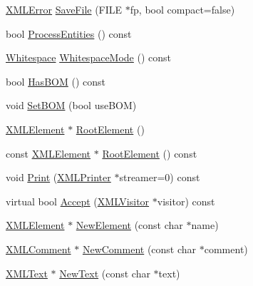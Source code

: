 \begin{DoxyCompactItemize}
\item 
\hyperlink{namespacetinyxml2_a1fbf88509c3ac88c09117b1947414e08}{X\+M\+L\+Error} \hyperlink{classtinyxml2_1_1_x_m_l_document_a8b95779479a0035acc67b3a61dfe1b74}{Save\+File} (F\+I\+L\+E $\ast$fp, bool compact=false)
\item 
bool \hyperlink{classtinyxml2_1_1_x_m_l_document_adfcff7d0599cd520e9fcbb8891e1b678}{Process\+Entities} () const 
\item 
\hyperlink{namespacetinyxml2_a7f91d00f77360f850fd5da0861e27dd5}{Whitespace} \hyperlink{classtinyxml2_1_1_x_m_l_document_a94b3ea2f77c9ac831723984df5a02d01}{Whitespace\+Mode} () const 
\item 
bool \hyperlink{classtinyxml2_1_1_x_m_l_document_a530649e9de7e5aa8df9c37f66197fcb6}{Has\+B\+O\+M} () const 
\item 
void \hyperlink{classtinyxml2_1_1_x_m_l_document_a14419b698f7c4b140df4e80f3f0c93b0}{Set\+B\+O\+M} (bool use\+B\+O\+M)
\item 
\hyperlink{classtinyxml2_1_1_x_m_l_element}{X\+M\+L\+Element} $\ast$ \hyperlink{classtinyxml2_1_1_x_m_l_document_ad2b70320d3c2a071c2f36928edff3e1c}{Root\+Element} ()
\item 
const \hyperlink{classtinyxml2_1_1_x_m_l_element}{X\+M\+L\+Element} $\ast$ \hyperlink{classtinyxml2_1_1_x_m_l_document_a23a25b573d2adf3ee6075636c2a31c73}{Root\+Element} () const 
\item 
void \hyperlink{classtinyxml2_1_1_x_m_l_document_a686ea28672c0e0c60383ec28148c1ac0}{Print} (\hyperlink{classtinyxml2_1_1_x_m_l_printer}{X\+M\+L\+Printer} $\ast$streamer=0) const 
\item 
virtual bool \hyperlink{classtinyxml2_1_1_x_m_l_document_aa08503d24898bf9992ae5e5fb8b0cf87}{Accept} (\hyperlink{classtinyxml2_1_1_x_m_l_visitor}{X\+M\+L\+Visitor} $\ast$visitor) const 
\item 
\hyperlink{classtinyxml2_1_1_x_m_l_element}{X\+M\+L\+Element} $\ast$ \hyperlink{classtinyxml2_1_1_x_m_l_document_a3c335a700a43d7c363a393142a23f234}{New\+Element} (const char $\ast$name)
\item 
\hyperlink{classtinyxml2_1_1_x_m_l_comment}{X\+M\+L\+Comment} $\ast$ \hyperlink{classtinyxml2_1_1_x_m_l_document_a386df0befd06aadb5e0cd21381aa955a}{New\+Comment} (const char $\ast$comment)
\item 
\hyperlink{classtinyxml2_1_1_x_m_l_text}{X\+M\+L\+Text} $\ast$ \hyperlink{classtinyxml2_1_1_x_m_l_document_acece5de77a0819f2341b08c1e1ed9987}{New\+Text} (const char $\ast$text)
\item 

\end{DoxyCompactItemize}
